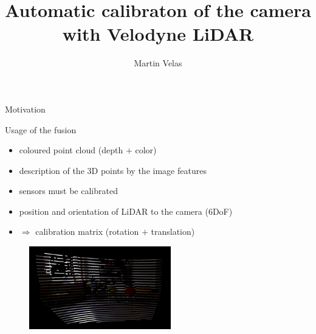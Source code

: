 \documentclass[pdf]{beamer}
\begin{document}
	\usenavigationsymbolstemplate{}
	\title {Automatic calibraton of the camera with Velodyne LiDAR}
	\author {Martin Velas}
	\begin{frame}
		\titlepage
	\end{frame}
	
	\begin{frame}{Motivation}
 		\begin{block}{Usage of the fusion}
			\begin{itemize}
				\item coloured point cloud (depth $+$ color)
				\item description of the $3$D points by the image features
				\item sensors must be calibrated
			\end{itemize}
		\end{block}

		\begin{itemize}
			\item position and orientation of LiDAR to the camera ($6$DoF)
			\item $\Rightarrow$ calibration matrix (rotation $+$ translation)
		\end{itemize}
		
		\begin{figure}[h]
			\center
			\includegraphics[width=0.55\textwidth]{fig/colored_cloud.png}
		\end{figure}
			
	\end{frame}
	
\end{document}
